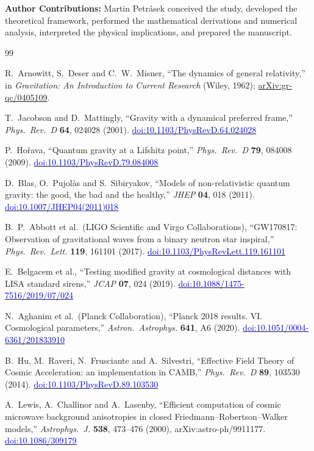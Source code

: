 \documentclass[11pt,a4paper]{article}
\newcommand{\doi}[1]{\href{https://doi.org/#1}{\textcolor{blue}{doi:#1}}}
\begin{document}
\noindent
\textbf{Author Contributions:}
Martin Petrásek conceived the study, developed the theoretical framework,
performed the mathematical derivations and numerical analysis, interpreted the
physical implications, and prepared the manuscript.


\begin{thebibliography}{99}

R.~Arnowitt, S.~Deser and C.~W.~Misner,
``The dynamics of general relativity,''
in \emph{Gravitation: An Introduction to Current Research}
(Wiley, 1962);
\href{https://arxiv.org/abs/gr-qc/0405109}{arXiv:gr-qc/0405109}.

T.~Jacobson and D.~Mattingly,
``Gravity with a dynamical preferred frame,''
\emph{Phys.\ Rev.\ D} \textbf{64}, 024028 (2001).
\doi{10.1103/PhysRevD.64.024028}

P.~Ho\v{r}ava,
``Quantum gravity at a Lifshitz point,''
\emph{Phys.\ Rev.\ D} \textbf{79}, 084008 (2009).
\doi{10.1103/PhysRevD.79.084008}

D.~Blas, O.~Pujol\`as and S.~Sibiryakov,
``Models of non-relativistic quantum gravity: the good, the bad and the healthy,''
\emph{JHEP} \textbf{04}, 018 (2011).
\doi{10.1007/JHEP04(2011)018}

B.~P.~Abbott et al.\ (LIGO Scientific and Virgo Collaborations),
``GW170817: Observation of gravitational waves from a binary neutron star inspiral,''
\emph{Phys.\ Rev.\ Lett.} \textbf{119}, 161101 (2017).
\doi{10.1103/PhysRevLett.119.161101}

E.~Belgacem et al.,
``Testing modified gravity at cosmological distances with LISA standard sirens,''
\emph{JCAP} \textbf{07}, 024 (2019).
\doi{10.1088/1475-7516/2019/07/024}

N.~Aghanim et al.\ (Planck Collaboration),
``Planck 2018 results. VI. Cosmological parameters,''
\emph{Astron.\ Astrophys.} \textbf{641}, A6 (2020).
\doi{10.1051/0004-6361/201833910}

B.~Hu, M.~Raveri, N.~Frusciante and A.~Silvestri,
``Effective Field Theory of Cosmic Acceleration: an implementation in CAMB,''
\emph{Phys.\ Rev.\ D} \textbf{89}, 103530 (2014).
\doi{10.1103/PhysRevD.89.103530}

A.~Lewis, A.~Challinor and A.~Lasenby,
``Efficient computation of cosmic microwave background anisotropies in closed
Friedmann--Robertson--Walker models,''
\emph{Astrophys.\ J.} \textbf{538}, 473--476 (2000), arXiv:astro-ph/9911177.
\doi{10.1086/309179}


\end{thebibliography}
\end{document}
